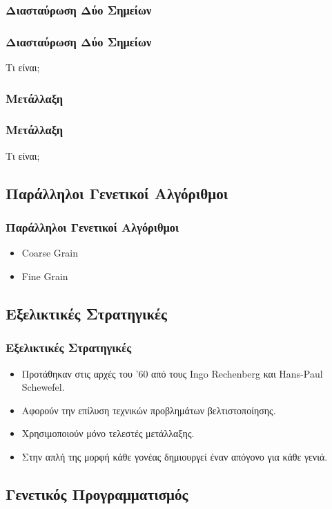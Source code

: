 \documentclass[xetex,mathserif,serif,14pt]{beamer}
\begin{document}
\subsubsection{Διασταύρωση Δύο Σημείων}

\begin{frame}
\frametitle{Διασταύρωση Δύο Σημείων}
Τι είναι;
\end{frame}

\subsubsection{Μετάλλαξη}

\begin{frame}
\frametitle{Μετάλλαξη}
Τι είναι;
\end{frame}

\subsection{Παράλληλοι Γενετικοί Αλγόριθμοι}

\begin{frame}
\frametitle{Παράλληλοι Γενετικοί Αλγόριθμοι}
\begin{itemize}
  \item Coarse Grain
  \item Fine Grain
\end{itemize}
\end{frame}

\subsection{Εξελικτικές Στρατηγικές}

\begin{frame}
\frametitle{Εξελικτικές Στρατηγικές}
\begin{itemize}
  \item Προτάθηκαν στις αρχές του '60 από τους Ingo Rechenberg και Hans-Paul Schewefel.
  \item Αφορούν την επίλυση τεχνικών προβλημάτων βελτιστοποίησης.
  \item Χρησιμοποιούν μόνο τελεστές μετάλλαξης.
  \item Στην απλή της μορφή κάθε γονέας δημιουργεί έναν απόγονο για κάθε γενιά.
\end{itemize}
\end{frame}

\subsection{Γενετικός Προγραμματισμός}
\end{document}
